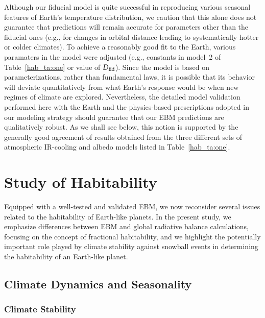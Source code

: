 Although our fiducial model is quite successful in reproducing various
seasonal features of Earth's temperature distribution, we caution that
this alone does not guarantee that predictions will remain accurate
for parameters other than the fiducial ones (e.g., for changes in
orbital distance leading to systematically hotter or colder climates).
To achieve a reasonably good fit to the Earth, various paramaters in
the model were adjusted (e.g., constants in model~2 of
Table~\ref{hab_ta:one} or value of $D_{\rm fid}$).  Since the model
is based on parameterizations, rather than fundamental laws, it is
possible that its behavior will deviate quantitatively from what
Earth's response would be when new regimes of climate are
explored. Nevertheless, the detailed model validation performed here
with the Earth and the physics-based prescriptions adopted in our
modeling strategy should guarantee that our EBM predictions are
qualitatively robust. As we shall see below, this notion is supported
by the generally good agreement of results obtained from the three
different sets of atmospheric IR-cooling and albedo models listed in
Table~\ref{hab_ta:one}.


\section{Study of Habitability}
\label{hab_sec:Hab Zones}

Equipped with a well-tested and validated EBM, we now reconsider
several issues related to the habitability of Earth-like planets. In
the present study, we emphasize differences between EBM and global
radiative balance calculations, focusing on the concept of fractional
habitability, and we highlight the potentially important role played
by climate stability against snowball events in determining the
habitability of an Earth-like planet.


\subsection{Climate Dynamics and Seasonality}
\label{hab_ssec:Temp}

\subsubsection{Climate Stability}
\label{hab_sssec:Clim Stab}

